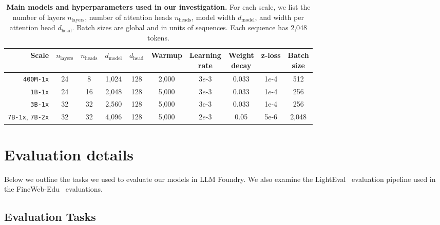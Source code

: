 \documentclass{article}
\newcommand{\hqpool}{\textsc{DCLM-baseline}\xspace}
\newcommand{\xstrack}{\texttt{400M-1x}\xspace}
\newcommand{\strack}{\texttt{1B-1x}\xspace}
\newcommand{\mtrack}{\texttt{3B-1x}\xspace}
\newcommand{\ltrack}{\texttt{7B-1x}\xspace}
\newcommand{\xltrack}{\texttt{7B-2x}\xspace}
\begin{document}
\begin{table}[tp]
    \centering
    \small
    \caption{\textbf{Main models and hyperparameters used in our investigation.} For each scale, we list the number of layers $n_{\text{layers}}$, number of attention heads $n_{\text{heads}}$, model width $d_{\text{model}}$, and width per attention head $d_{\text{head}}$. Batch sizes are global and in units of sequences. Each sequence has 2,048 tokens.
    }
    \begin{tabular}{rccccccccc}
        \toprule
        Scale & $n_{\text{layers}}$ & $n_{\text{heads}}$ & $d_{\text{model}}$ & $d_{\text{head}}$ & Warmup & \makecell{Learning \\rate} & \makecell{Weight \\decay} & z-loss & \makecell{Batch \\size} \\\midrule
        \xstrack & 24 & 8 & 1,024 & 128 & 2,000 & 3$e$-3 & 0.033 & 1$e$-4 & 512 \\
        \strack & 24 & 16 & 2,048 & 128 & 5,000 & 3$e$-3 & 0.033 & 1$e$-4 & 256 \\
        \mtrack & 32 & 32 & 2,560 & 128 & 5,000 & 3e-3 & 0.033 & 1e-4 & 256 \\
        \ltrack, \xltrack & 32 & 32 & 4,096 & 128 & 5,000 & 2$e$-3 &  0.05 & 5e-6 & 2,048 \\\bottomrule
    \end{tabular}
    \label{tab:hparams}
\end{table}

\begin{table}[h]
\centering
\caption{\textbf{Learning rate and weight decay sweep} (\ltrack{} scale). We evaluated the impact of learning rate and weight decay on an earlier iteration of \hqpool. Based on this sweep, we specify the settings for~ for the \ltrack and \xltrack scales.}

\label{tab:hparams_7b}
\end{table}


\section{Evaluation details}\label{appx:evaluation}
Below we outline the tasks we used to evaluate our models in LLM Foundry. We also examine the LightEval~\citep{lighteval} evaluation pipeline used in the FineWeb-Edu~\citep{lozhkov2024fineweb-edu} evaluations.

\subsection{Evaluation Tasks}
\end{document}

